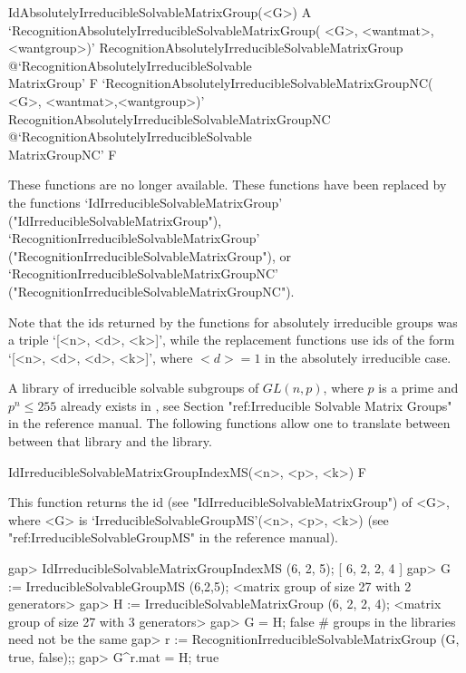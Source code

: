 \>IdAbsolutelyIrreducibleSolvableMatrixGroup(<G>) A
\>`RecognitionAbsolutelyIrreducibleSolvableMatrixGroup(%
   <G>, <wantmat>, <wantgroup>)'%
{RecognitionAbsolutelyIrreducibleSolvableMatrixGroup}%
@{`RecognitionAbsolutelyIrreducibleSolvable\\MatrixGroup'} F
\>`RecognitionAbsolutelyIrreducibleSolvableMatrixGroupNC(%
   <G>, <wantmat>,<wantgroup>)'%
{RecognitionAbsolutelyIrreducibleSolvableMatrixGroupNC}%
@{`RecognitionAbsolutelyIrreducibleSolvable\\MatrixGroupNC'} F

These functions are no longer available. These functions have been replaced by the
functions 
`IdIrreducibleSolvableMatrixGroup' ("IdIrreducibleSolvableMatrixGroup"), 
`RecognitionIrreducibleSolvableMatrixGroup' ("RecognitionIrreducibleSolvableMatrixGroup"), or
`RecognitionIrreducibleSolvableMatrixGroupNC' ("RecognitionIrreducibleSolvableMatrixGroupNC").

Note that the ids returned by the functions for absolutely irreducible groups was a triple `[<n>, <d>, <k>]', while the replacement functions use ids of the form `[<n>, <d>, <d>, <k>]', where $<d> = 1$ in the absolutely irreducible case.



A library of irreducible solvable subgroups of $GL(n, p)$, where $p$ is a 
prime and $p^n \leq 255$ already exists in {\GAP}, see Section "ref:Irreducible Solvable Matrix Groups" in the {\GAP} reference manual. The following functions
allow one to translate between between that library and the {\IRREDSOL} library. 


\>IdIrreducibleSolvableMatrixGroupIndexMS(<n>, <p>, <k>) F

This function returns the id (see "IdIrreducibleSolvableMatrixGroup") of <G>, 
where <G> is `IrreducibleSolvableGroupMS'(<n>, <p>, <k>) (see "ref:IrreducibleSolvableGroupMS" in the {\GAP} reference manual).

\beginexample
gap> IdIrreducibleSolvableMatrixGroupIndexMS (6, 2, 5);
[ 6, 2, 2, 4 ]
gap> G := IrreducibleSolvableGroupMS (6,2,5);
<matrix group of size 27 with 2 generators>
gap> H := IrreducibleSolvableMatrixGroup (6, 2, 2, 4);
<matrix group of size 27 with 3 generators>
gap> G = H;
false 
# groups in the libraries need not be the same
gap> r := RecognitionIrreducibleSolvableMatrixGroup (G, true, false);;
gap> G^r.mat = H;
true
\endexample

